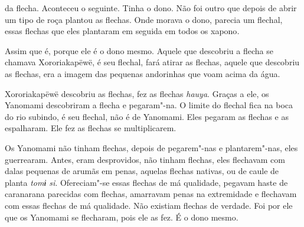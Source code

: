  

 da flecha. Aconteceu o seguinte. Tinha o dono. Não foi outro
que depois de abrir um tipo de roça plantou as flechas. Onde morava o
dono, parecia um flechal, essas flechas que eles plantaram em seguida em
todos os xapono\emph{.}

Assim que é, porque ele é o dono mesmo. Aquele que descobriu a flecha se
chamava Xororiakapëwë, é seu flechal, fará atirar as flechas, aquele que
descobriu as flechas, era a imagem das pequenas andorinhas que voam
acima da água. 

Xororiakapëwë descobriu as flechas, fez as flechas \emph{hauya}. Graças
a ele, os Yanomami descobriram a flecha e pegaram"-na. O limite do
flechal fica na boca do rio subindo, é seu flechal, não é de Yanomami.
Eles pegaram as flechas e as espalharam. Ele fez as flechas se
multiplicarem. 

Os Yanomami não tinham flechas, depois de pegarem"-nas e plantarem"-nas,
eles guerrearam. Antes, eram desprovidos, não tinham flechas, eles
flechavam com dalas pequenas de arumãs em penas, aquelas flechas nativas,
ou de caule de planta \emph{tomɨ si}. Ofereciam"-se essas flechas de má
qualidade, pegavam haste de caranarana parecidas com flechas, amarravam
penas na extremidade e flechavam com essas flechas de má qualidade. Não
existiam flechas de verdade. Foi por ele que os Yanomami se flecharam,
pois ele as fez. É o dono mesmo. 

 
